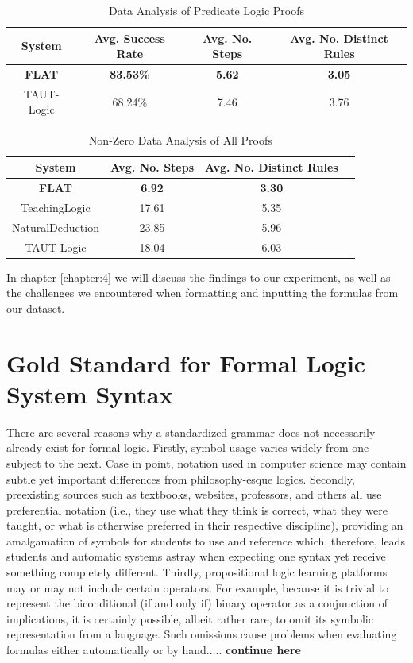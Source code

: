 \documentclass[ms]{uncgdissertationexp2}
\theoremstyle{plain}
\theoremstyle{definition}
\theoremstyle{remark}
\begin{document}
\begin{table}[!ht]
	\centering
	\caption{Data Analysis of Predicate Logic Proofs}
	\begin{tabularx}{\textwidth}{*4c}
		\toprule
		System        & Avg. Success Rate & Avg. No. Steps & Avg. No. Distinct Rules \\    
		\midrule
		\textbf{FLAT} & \textbf{83.53\%}  & \textbf{5.62}  & \textbf{3.05}           \\
		TAUT-Logic    & 68.24\%           & 7.46           & 3.76                    \\
		\bottomrule
	\end{tabularx}
	\label{table:predData}
\end{table}

\begin{table}[!ht]
	\centering
	\caption{Non-Zero Data Analysis of All Proofs}
	\begin{tabularx}{\textwidth}{*4c}
		\toprule
		System           & Avg. No. Steps & Avg. No. Distinct Rules \\    
		\midrule
		\textbf{FLAT}    & \textbf{6.92}  & \textbf{3.30}           \\
		TeachingLogic    & 17.61          & 5.35                    \\
		NaturalDeduction & 23.85          & 5.96                    \\
		TAUT-Logic       & 18.04          & 6.03                    \\
		\bottomrule
	\end{tabularx}
	\label{table:nzAllData}
\end{table}
In chapter \ref{chapter:4} we will discuss the findings to our experiment, as well as the challenges we encountered when formatting and inputting the formulas from our dataset.

\section{Gold Standard for Formal Logic System Syntax}
There are several reasons why a standardized grammar does not necessarily already exist for formal logic. Firstly, symbol usage varies widely from one subject to the next. Case in point, notation used in computer science may contain subtle yet important differences from philosophy-esque logics. Secondly, preexisting sources such as textbooks, websites, professors, and others all use preferential notation (i.e., they use what they think is correct, what they were taught, or what is otherwise preferred in their respective discipline), providing an amalgamation of symbols for students to use and reference which, therefore, leads students and automatic systems astray when expecting one syntax yet receive something completely different. Thirdly, propositional logic learning platforms may or may not include certain operators. For example, because it is trivial to represent the biconditional (if and only if) binary operator as a conjunction of implications, it is certainly possible, albeit rather rare, to omit its symbolic representation from a language. Such omissions cause problems when evaluating formulas either automatically or by hand..... \textbf{continue here}
\end{document}
